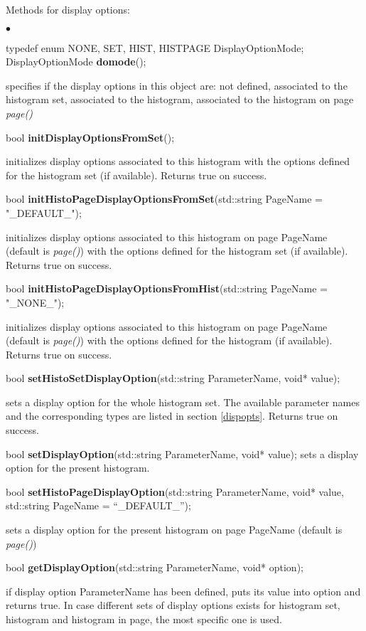 \documentclass{lhcbnote}
\begin{document}
Methods for display options:
\begin{list}{$\bullet$}{}
\item typedef enum { NONE, SET, HIST, HISTPAGE } DisplayOptionMode;\\
     DisplayOptionMode {\bf domode}();
  
specifies if the display options in this object are: not defined,
associated to the histogram set, associated to the histogram,
associated to the histogram on  page {\it page()}
  
\item  bool {\bf initDisplayOptionsFromSet}(); 

initializes display options associated to this histogram with the
options defined for the histogram set (if available). Returns true on
success.

\item  bool {\bf initHistoPageDisplayOptionsFromSet}(std::string PageName = "\_DEFAULT\_");

initializes display options associated to this histogram on page
PageName (default is {\it page()}) with the
options defined for the histogram set (if available). Returns true on
success.

\item  bool {\bf initHistoPageDisplayOptionsFromHist}(std::string PageName = "\_NONE\_"); 

initializes display options associated to this histogram on page
PageName (default is {\it page()}) with the
options defined for the histogram (if available). Returns true on
success.

\item   bool {\bf setHistoSetDisplayOption}(std::string ParameterName, 
				void* value);

sets a display option for the whole histogram set. The available
parameter names and the corresponding types are listed in section
\ref{dispopts}. Returns true on success.


\item bool {\bf setDisplayOption}(std::string ParameterName, 
			void* value);
sets a display option for the present histogram.


\item  bool {\bf setHistoPageDisplayOption}(std::string ParameterName, 
				 void* value,
				 std::string PageName = ``\_DEFAULT\_'');

sets a display option for the present histogram on page
PageName (default is {\it page()})

\item   bool {\bf getDisplayOption}(std::string ParameterName,
					 void* option);

if display option  ParameterName has been defined, puts its value into
option and returns true. In case different sets of display options
exists for histogram set, histogram and histogram in page, the most
specific one is used.

\end{list}
\end{document}
